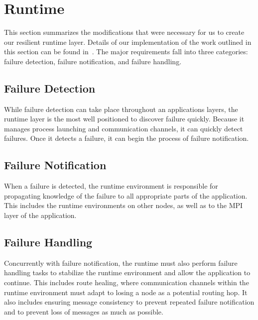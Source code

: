 \section{Runtime} \label{sect:runtime}

This section summarizes the modifications that were necessary for us to create our resilient runtime layer. Details of our implementation of the work outlined in this section can be found in~\cite{Bland:CCGrid12}. The major requirements fall into three categories: failure detection, failure notification, and failure handling.

\subsection{Failure Detection} \label{subsect:failure_detection}

While failure detection can take place throughout an applications layers, the runtime layer is the most well positioned to discover failure quickly. Because it manages process launching and communication channels, it can quickly detect failures. Once it detects a failure, it can begin the process of failure notification. 

\subsection{Failure Notification} \label{subsect:failure_notification}

When a failure is detected, the runtime environment is responsible for propagating knowledge of the failure to all appropriate parts of the application. This includes the runtime environments on other nodes, as well as to the MPI layer of the application.

\subsection{Failure Handling} \label{subsect:failure_handling}

Concurrently with failure notification, the runtime must also perform failure handling tasks to stabilize the runtime environment and allow the application to continue. This includes route healing, where communication channels within the runtime environment must adapt to losing a node as a potential routing hop. It also includes ensuring message consistency to prevent repeated failure notification and to prevent loss of messages as much as possible.